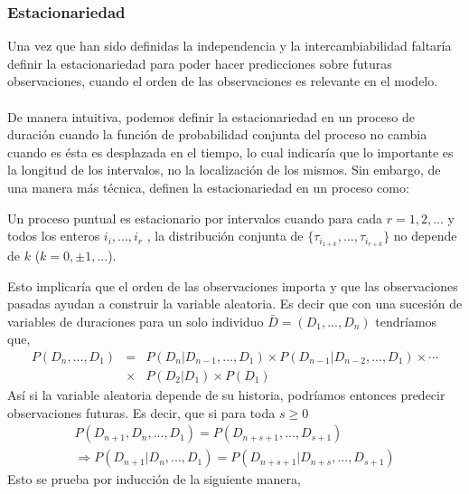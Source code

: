 \subsubsection{Estacionariedad}
Una vez que han sido definidas la independencia y la intercambiabilidad faltar\'ia definir la estacionariedad para poder hacer predicciones sobre futuras observaciones, cuando el orden de las observaciones es relevante en el modelo.\\
\\
De manera intuitiva, podemos definir la estacionariedad en un proceso de duraci\'on cuando la funci\'on de probabilidad conjunta del proceso no cambia cuando es \'esta es desplazada en el tiempo, lo cual indicar\'ia que lo importante es la longitud de los intervalos, no la localizaci\'on de los mismos. Sin embargo, de una manera m\'as t\'ecnica, \cite{daley2003} definen la estacionariedad en un proceso como:
\begin{defi}
Un proceso puntual es estacionario por intervalos cuando para cada $r=1,2,...$ y todos los enteros $i_i,...,i_r$ , la distribuci\'on conjunta de $\{\tau_{i_{1+k}},...,\tau_{i_{r+k}}\}$ no depende de $k$ ($k=0, \pm 1, ...$).
\end{defi}
Esto implicar\'ia que el orden de las observaciones importa y que las observaciones pasadas ayudan a construir la variable aleatoria. Es decir que con una sucesi\'on de variables de duraciones para un solo individuo $\bar{D}=(D_1,...,D_n)$ tendr\'iamos que,
\begin{eqnarray*}
P(D_n,...,D_1)&=&P(D_n|D_{n-1},...,D_1)\times P(D_{n-1}|D_{n-2},...,D_1)\times \cdots\\
               &\times& P(D_2|D_1)\times P(D_1)
\end{eqnarray*}	
As\'i si la variable aleatoria depende de su historia, podr\'iamos entonces predecir observaciones futuras. Es decir, que si para toda $s \geq 0$
\begin{multline*}
P(D_{n+1},D_n,...,D_1)=P(D_{n+s+1},...,D_{s+1})\\
\Rightarrow P(D_{n+1}|D_n,...,D_1) = P(D_{n+s+1}|D_{n+s},...,D_{s+1})
\end{multline*}
Esto se prueba por inducci\'on de la siguiente manera,
